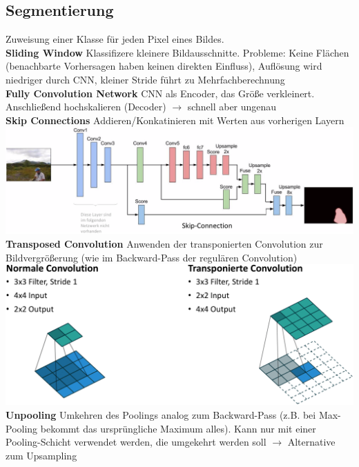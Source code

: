 \documentclass[12pt]{article}
\begin{document}
	\subsection{Segmentierung}
	Zuweisung einer Klasse für jeden Pixel eines Bildes.\\
	\textbf{Sliding Window} Klassifizere kleinere Bildausschnitte. Probleme: Keine Flächen (benachbarte Vorhersagen haben keinen direkten Einfluss), Auflösung wird niedriger durch CNN, kleiner Stride führt zu Mehrfachberechnung\\
	\textbf{Fully Convolution Network} CNN als Encoder, das Größe verkleinert. Anschließend hochskalieren (Decoder) $\rightarrow$ schnell aber ungenau\\
	\textbf{Skip Connections} Addieren/Konkatinieren mit Werten aus vorherigen Layern\\
	\includegraphics[width=\linewidth]{figures/skip-connections.png}\\
	\textbf{Transposed Convolution} Anwenden der transponierten Convolution zur Bildvergrößerung (wie im Backward-Pass der regulären Convolution)\\
	\includegraphics[width=\linewidth]{figures/transposed-convolution.png}\\
	\textbf{Unpooling} Umkehren des Poolings analog zum Backward-Pass (z.B. bei Max-Pooling bekommt das ursprüngliche Maximum alles). Kann nur mit einer Pooling-Schicht verwendet werden, die umgekehrt werden soll $\rightarrow$ Alternative zum Upsampling
\end{document}

